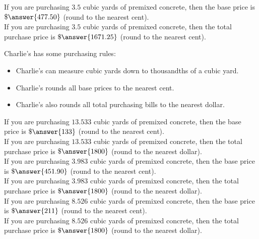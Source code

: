 \documentclass{ximera}
\begin{document}
\begin{exercise}

If you are purchasing $3.5$ cubic yards of premixed concrete, then the base price is $\$\answer{477.50}$ (round to the nearest cent). \\

If you are purchasing $3.5$ cubic yards of premixed concrete, then the total purchase price is $\$\answer{1671.25}$ (round to the nearest cent). \\

\end{exercise}






Charlie's has some purchasing rules:
\begin{itemize}
\item Charlie's can measure cubic yards down to thousandths of a cubic yard. 
\item Charlie's rounds all base prices to the nearest cent.
\item Charlie's also rounds all total purchasing bills to the nearest dollar.
\end{itemize}






\begin{exercise}

If you are purchasing $13.533$ cubic yards of premixed concrete, then the base price is $\$\answer{133}$ (round to the nearest cent). \\

If you are purchasing $13.533$ cubic yards of premixed concrete, then the total purchase price is $\$\answer{1800}$ (round to the nearest dollar). \\



If you are purchasing $3.983$ cubic yards of premixed concrete, then the base price is $\$\answer{451.90}$ (round to the nearest cent). \\

If you are purchasing $3.983$ cubic yards of premixed concrete, then the total purchase price is $\$\answer{1800}$ (round to the nearest dollar). \\



If you are purchasing $8.526$ cubic yards of premixed concrete, then the base price is $\$\answer{211}$ (round to the nearest cent). \\

If you are purchasing $8.526$ cubic yards of premixed concrete, then the total purchase price is $\$\answer{1800}$ (round to the nearest dollar). \\




\end{exercise}
\end{document}
